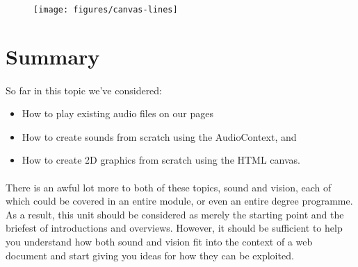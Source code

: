 \begin{figure}[H]
\centering
\texttt{[image: figures/canvas-lines]}
\label{fig:canvas-lines}
\caption{}
\end{figure}


\section{Summary}
\paragraph{} So far in this topic we've considered:

\begin{itemize}
\item How to play existing audio files on our pages
\item How to create sounds from scratch using the AudioContext, and
\item How to create 2D graphics from scratch using the HTML canvas.
\end{itemize}

\paragraph{} There is an awful lot more to both of these topics, sound and vision, each of which could be covered in an entire module, or even an entire degree programme. As a result, this unit should be considered as merely the starting point and the briefest of introductions and overviews. However, it should be sufficient to help you understand how both sound and vision fit into the context of a web document and start giving you ideas for how they can be exploited.
